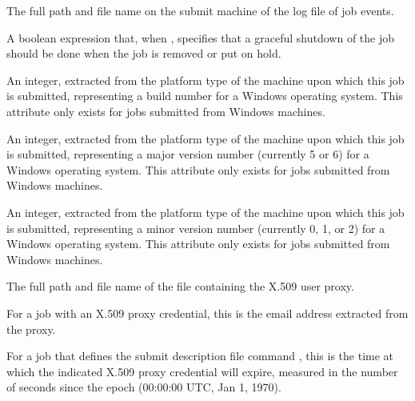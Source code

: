 \begin{description}
\item[\AdAttr{UserLog}:] The full path and file name on the submit machine
of the log file of job events.   

\item[\AdAttr{WantGracefulRemoval}:] A boolean expression that,
when , specifies that a graceful shutdown of the job
should be done when the job is removed or put on hold.

\item[\AdAttr{WindowsBuildNumber}:] An integer, extracted from the
platform type of the machine upon which this job is submitted,
representing a build number for a Windows operating system.
This attribute only exists for jobs submitted from Windows machines.

\item[\AdAttr{WindowsMajorVersion}:] An integer, extracted from the
platform type of the machine upon which this job is submitted,
representing a major version number (currently 5 or 6)
for a Windows operating system.
This attribute only exists for jobs submitted from Windows machines.

\item[\AdAttr{WindowsMinorVersion}:] An integer, extracted from the
platform type of the machine upon which this job is submitted, 
representing a minor version number (currently 0, 1, or 2)
for a Windows operating system.
This attribute only exists for jobs submitted from Windows machines.

\item[\AdAttr{X509UserProxy}:]   
The full path and file name of the file containing the X.509 user proxy.

\item[\AdAttr{X509UserProxyEmail}:]   
\item For a job with an X.509 proxy credential, this is the email
address extracted from the proxy.

\item[\AdAttr{X509UserProxyExpiration}:]   
For a job that defines the submit description file command
, this is the time at which the indicated
X.509 proxy credential will expire, measured in the
number of seconds since the epoch (00:00:00 UTC, Jan 1, 1970).


\end{description}
